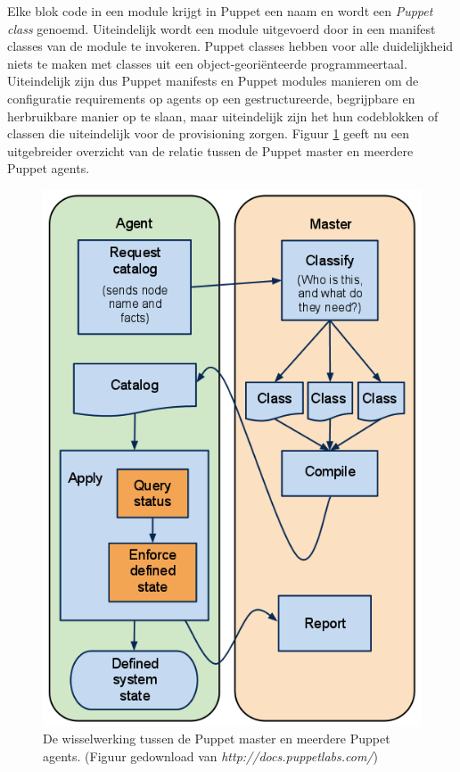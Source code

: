 \documentclass[a4paper,11pt]{article}
\theoremstyle{definition}
\begin{document}
\noindent Elke blok code in een 
module krijgt in Puppet een naam en wordt een \emph{Puppet class} genoemd. 
Uiteindelijk wordt een module uitgevoerd door in een manifest classes van de 
module te invokeren. Puppet classes hebben voor alle duidelijkheid niets te maken met classes uit een object-georiënteerde programmeertaal.
 Uiteindelijk zijn dus Puppet manifests en Puppet modules manieren
om de configuratie requirements op agents op een gestructureerde, begrijpbare en herbruikbare manier op te slaan, maar uiteindelijk
zijn het hun codeblokken of classen die uiteindelijk voor de provisioning zorgen. Figuur \ref{o2} geeft nu een uitgebreider overzicht van de 
relatie tussen de Puppet master en meerdere Puppet agents.
\begin{figure}[h]
  \centering
  \includegraphics[scale=0.4]{o2.png}\caption{De wisselwerking tussen de Puppet master en meerdere Puppet agents. (Figuur gedownload van \emph{http://docs.puppetlabs.com/})}\label{o2}
\end{figure}
\end{document}
